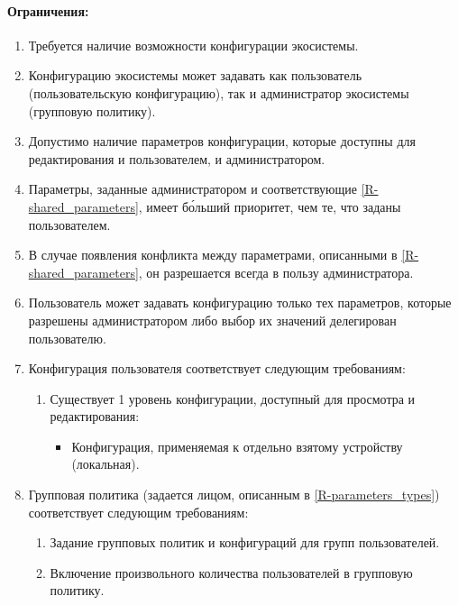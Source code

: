 \paragraph*{Ограничения:}
\begin{enumerate}[label={\bfseries О-\arabic*.}]
   \item Требуется наличие возможности конфигурации экосистемы.
   \item Конфигурацию экосистемы может задавать как пользователь (пользовательскую конфигурацию), так и администратор экосистемы (групповую политику).
   \item Допустимо наличие параметров конфигурации, которые доступны для редактирования и пользователем, и администратором.
         \label{R-shared_parameters}
   \item Параметры, заданные администратором и соответствующие \ref{R-shared_parameters}, имеет б\'{о}льший приоритет, чем те, что заданы пользователем.
         \label{R-parameters_types}
   \item В случае появления конфликта между параметрами, описанными в \ref{R-shared_parameters}, он разрешается всегда в пользу администратора.
   \item Пользователь может задавать конфигурацию только тех параметров, которые разрешены администратором либо выбор их значений делегирован пользователю.
   \item Конфигурация пользователя соответствует следующим требованиям:
         \begin{enumerate}[nosep,label*={\bfseries\arabic*.}]
            \item Существует 1 уровень конфигурации, доступный для просмотра и редактирования:
                  \begin{itemize}
                     \item Конфигурация, применяемая к отдельно взятому устройству (локальная).
                           \label{UR-config_levels}
                  \end{itemize}
         \end{enumerate}
   \item Групповая политика (задается лицом, описанным в \ref{R-parameters_types}) соответствует следующим требованиям:
         \begin{enumerate}[nosep,label*={\bfseries\arabic*.}]
            \item Задание групповых политик и конфигураций для групп пользователей.
            \item Включение произвольного количества пользователей в групповую политику.

\end{enumerate}
\end{enumerate}
